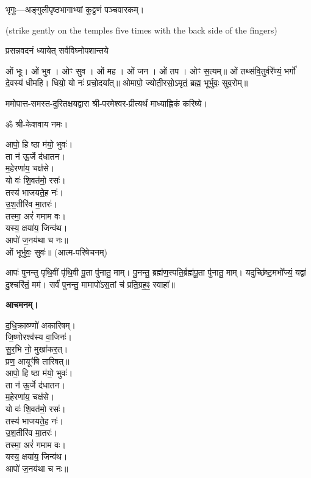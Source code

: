 
भृगुः—अङ्गुलीपृष्ठभागाभ्यां कुट्टणं पञ्चवारकम्।

{\scriptsize (strike gently on the temples five times with the back side of the fingers)}

{प्रसन्नवदनं ध्यायेत् सर्वविघ्नोपशान्तये}


ओं भूः। ओं भुव। ओꣳ सुव। ओं मह। ओं जन। ओं तप। ओꣳ स॒त्यम्॥
ओं तथ्स॑वि॒तुर्वरे᳚ण्यं॒ भर्गो॑ दे॒वस्य॑ धीमहि। धियो॒ यो नः॑ प्रचो॒दया᳚त्॥
ओमापो॒ ज्योती॒रसो॒ऽमृतं॒ ब्रह्म॒ भूर्भुवः॒ सुव॒रोम्॥


ममोपात्त-समस्त-दुरितक्षयद्वारा श्री-परमेश्वर-प्रीत्यर्थं माध्याह्निकं करिष्ये।


ॐ श्री-केशवाय नमः।

आपो॒ हि ष्ठा म॑यो॒ भुवः॑।\\
ता न॑ ऊ॒र्जे द॑धातन।\\
म॒हेरणा॑य॒ चक्ष॑से।\\
यो वः॑ शि॒वत॑मो॒ रसः॑।\\
तस्य॑ भाजयते॒ह नः॑।\\
उ॒श॒तीरि॑व मा॒तरः॑।\\
तस्मा॒ अरं॑ गमाम वः।\\
यस्य॒ क्षया॑य॒ जिन्व॑थ।\\
आपो॑ ज॒नय॑था च नः॥\\

ओं भूर्भुवः॒ सुवः॑॥ (आत्म-परिषेचनम्)


आपः॑ पुनन्तु पृथि॒वीं पृ॑थि॒वी पू॒ता पु॑नातु॒ माम्। पु॒नन्तु॒ ब्रह्म॑ण॒स्पति॒र्ब्रह्म॑पू॒ता पु॑नातु॒ माम्। यदुच्छि॑ष्ट॒मभो᳚ज्यं॒ यद्वा॑ दु॒श्चरि॑तं॒ मम॑। सर्वं॑ पुनन्तु॒ मामापो॑ऽस॒तां च॑ प्रति॒ग्रह॒ꣴ॒ स्वाहा᳚॥


\textbf{आचमनम्।}

द॒धि॒क्राव्ण्णो॑ अकारिषम्।\\
 जि॒ष्णोरश्व॑स्य वा॒जिनः॑।\\
सु॒र॒भि नो॒ मुखा॑कर॒त्।\\
प्रण॒ आयूꣳ॑षि तारिषत्॥\\



आपो॒ हि ष्ठा म॑यो॒ भुवः॑।\\
ता न॑ ऊ॒र्जे द॑धातन।\\
म॒हेरणा॑य॒ चक्ष॑से।\\
यो वः॑ शि॒वत॑मो॒ रसः॑।\\
तस्य॑ भाजयते॒ह नः॑।\\
उ॒श॒तीरि॑व मा॒तरः॑।\\
तस्मा॒ अरं॑ गमाम वः।\\
यस्य॒ क्षया॑य॒ जिन्व॑थ।\\
आपो॑ ज॒नय॑था च नः॥\\

